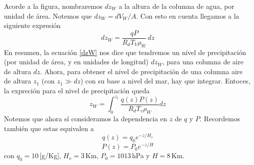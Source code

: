 \documentclass[class=article, crop=false]{standalone}
\begin{document}
Acorde a la figura, nombraremos $dz_W$ a la altura de la columna de agua, por unidad de área. Notemos que $dz_W = dV_W/A$. Con esto en cuenta llegamos a la siguiente expresión
\begin{equation}
   dz_W = \frac{qP}{R_dT_V \rho_W}\,dz \label{dzW} 
\end{equation}
En resumen, la ecuación \eqref{dzW} nos dice que tendremos un nivel de precipitación (por unidad de área, y en unidades de longitud) $dz_W$, para una columna de aire de altura $dz$. Ahora, para obtener el nivel de precipitación de una columna aire de altura $z_1$ (con $z_1 \gg dz$) con su base a nivel del mar, hay que integrar. Entoces, la expreción para el nivel de precipitación queda
\begin{equation}
    z_W = \int_0^{z_1} \frac{q(z)P(z)}{R_d T_v \rho_W} dz \label{zW}
\end{equation}
Notemos que ahora sí consideramos la dependencia en $z$ de $q$ y $P$. Recordemos también que estas equivalen a
\begin{equation}
    q(z) = q_0 e^{-z/H_v} \label{qz}
\end{equation}
\begin{equation}
    P(z) = P_0 e^{-z/H} \label{Pz}
\end{equation}
con $q_0 = 10\,$[g/Kg], $H_v = 3\,$Km, $P_0 = 1013\,$hPa y $H = 8\,$Km.\\ 
\end{document}
